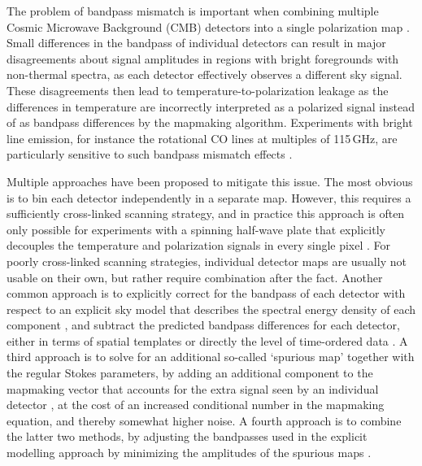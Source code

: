\documentclass{aa}
\begin{document}
The problem of bandpass mismatch is important when combining multiple Cosmic Microwave Background (CMB) detectors into a single polarization map \citep[e.g.,][]{page:2007,lfi2015,BP09}. Small differences in the bandpass of individual detectors can result in major disagreements about signal amplitudes in regions with bright foregrounds with non-thermal spectra, as each detector effectively observes a different sky signal. These disagreements then lead to temperature-to-polarization leakage as the differences in temperature are incorrectly interpreted as a polarized signal instead of as bandpass differences by the mapmaking algorithm. Experiments with bright line emission, for instance the rotational CO lines at multiples of 115\,GHz, are particularly sensitive to such bandpass mismatch effects \citep[e.g.,][]{hfi_processing:2013}. 

Multiple approaches have been proposed to mitigate this issue. The most obvious is to bin each detector independently in a separate map. However, this requires a sufficiently cross-linked scanning strategy, and in practice this approach is often only possible for experiments with a spinning half-wave plate that explicitly decouples the temperature and polarization signals in every single pixel \citep[e.g.,][]{abs:2016}. For poorly cross-linked scanning strategies, individual detector maps are usually not usable on their own, but rather require combination after the fact. Another common approach is to explicitly correct for the bandpass of each detector with respect to an explicit sky model that describes the spectral energy density of each component \citep[e.g.,][]{planck_fg:2015}, and subtract the predicted bandpass differences for each detector, either in terms of spatial templates \citep[e.g.,][]{lfi2015} or directly the level of time-ordered data \citep{bp01}. A third approach is to solve for an additional so-called `spurious map' together with the regular Stokes parameters, by adding an additional component to the mapmaking vector that accounts for the extra signal seen by an individual detector \citep{spurious}, at the cost of an increased conditional number in the mapmaking equation, and thereby somewhat higher noise. A fourth approach is to combine the latter two methods, by adjusting the bandpasses used in the explicit modelling approach by minimizing the amplitudes of the spurious maps \citep{BP09}.
\end{document}
